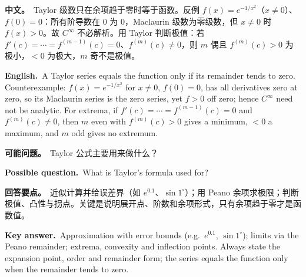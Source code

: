 \documentclass[UTF8,11pt,a4paper]{ctexart}
\newcommand{\BOTH}[2]{\par\noindent\textbf{中文。}\ #1\par\noindent\textbf{English.}\ #2\par}
\newcommand{\ASK}[4]{\begin{samepage}\par\noindent\textbf{可能问题。}\ #1\par\noindent\textbf{Possible question.}\ #2\par\noindent\textbf{回答要点。}\ #3\par\noindent\textbf{Key answer.}\ #4\medskip\end{samepage}}
\begin{document}
\BOTH{Taylor 级数只在余项趋于零时等于函数。反例 $f(x)=e^{-1/x^2}$（$x\ne0$）、$f(0)=0$：所有阶导数在 $0$ 为 $0$，Maclaurin 级数为零级数，但 $x\ne0$ 时 $f(x)>0$。故 $C^\infty$ 不必解析。用 Taylor 判断极值：若 $f'(c)=\cdots=f^{(m-1)}(c)=0$、$f^{(m)}(c)\ne0$，则 $m$ 偶且 $f^{(m)}(c)>0$ 为极小，$<0$ 为极大，$m$ 奇不是极值。}{A Taylor series equals the function only if its remainder tends to zero. Counterexample: $f(x)=e^{-1/x^2}$ for $x\ne0$, $f(0)=0$, has all derivatives zero at zero, so its Maclaurin series is the zero series, yet $f>0$ off zero; hence $C^\infty$ need not be analytic. For extrema, if $f'(c)=\cdots=f^{(m-1)}(c)=0$ and $f^{(m)}(c)\ne0$, then $m$ even with $f^{(m)}(c)>0$ gives a minimum, $<0$ a maximum, and $m$ odd gives no extremum.}
\ASK{Taylor 公式主要用来做什么？}{What is Taylor's formula used for?}{近似计算并给误差界（如 $e^{0.1}$、$\sin1^\circ$）；用 Peano 余项求极限；判断极值、凸性与拐点。关键是说明展开点、阶数和余项形式，只有余项趋于零才是函数值。}{Approximation with error bounds (e.g.\ $e^{0.1}$, $\sin1^\circ$); limits via the Peano remainder; extrema, convexity and inflection points. Always state the expansion point, order and remainder form; the series equals the function only when the remainder tends to zero.}
\end{document}
